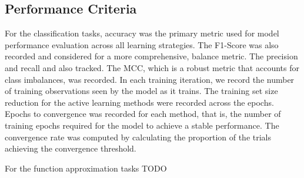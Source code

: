 \documentclass[10pt, conference]{IEEEtran}
\begin{document}





\subsection{Performance Criteria}
For the classification tasks, accuracy was the primary metric used for model performance evaluation across all learning strategies. The F1-Score was also recorded and considered for a more comprehensive, balance metric. The precision and recall and also tracked. The MCC, which is a robust metric that accounts for class imbalances, was recorded. In each training iteration, we record the number of training observations seen by the model as it trains. The training set size reduction for the active learning methods were recorded across the epochs. Epochs to convergence was recorded for each method, that is, the number of training epochs required for the model to achieve a stable performance. The convergence rate was computed by calculating the proportion of the trials achieving the convergence threshold.

For the function approximation tasks TODO
\end{document}
